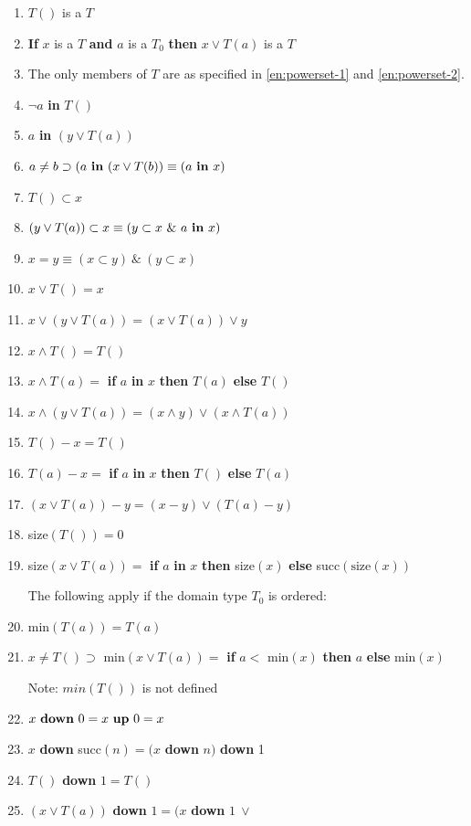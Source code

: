 \documentclass[twoside,11pt]{book}
\begin{document}
\begin{enumerate}[wide, nosep, label=(\arabic*)]
	\item \label{en:powerset-1}
	$T()$ is a $T$
	\item \label{en:powerset-2}
	\textbf{If} $x$ is a $T$ \textbf{and} $a$ is a $T_0$ \textbf{then} $x \vee T(a)$ is a $T$
	\item The only members of $T$ are as specified in \ref{en:powerset-1} and \ref{en:powerset-2}.
	\item $\neg a$ \textbf{in} $T()$
	\item $a$ \textbf{in} $(y \lor T(a))$
	\item $a \neq b \supset (a \text{ \textbf{in} } (x \lor T(b)) \equiv (a \text{ \textbf{in} } x)$
	\item $T() \subset x$
	\item $(y \lor T(a)) \subset x \equiv (y \subset x\ \&\ a \text{ \textbf{in} } x)$
	\item $x = y \equiv (x \subset y)\ \&\ (y \subset x)$
	\setcounter{enumi}{9}
	\item $x \lor T() = x$
	\item $x \lor (y \lor T(a)) = (x \lor T(a)) \lor y$
	\item $x \land T() = T()$
	\item $x \land T(a) =$ \textbf{if} $a$ \textbf{in} $x$ \textbf{then} $T(a)$ \textbf{else} $T()$
	\item $x \land (y \lor T(a)) = (x \land y) \lor (x \land T(a))$
	\item $T() - x = T()$
	\item $T(a) - x =$ \textbf{if} $a$ \textbf{in} $x$ \textbf{then} $T()$ \textbf{else} $T(a)$
	\item $(x \lor T(a)) - y = (x - y) \lor (T(a) - y)$
	\item size$(T()) = 0$
	\item size$(x \lor T(a)) =$ \textbf{if} $a$ \textbf{in} $x$ \textbf{then} size$(x)$ \textbf{else} succ$(\text{size}(x))$

	The following apply if the domain type $T_0$ is ordered:

	\item min$(T(a)) = T(a)$
	\item $x \neq T() \supset$ min$(x \lor T(a)) =$ \textbf{if} $a <$ min$(x)$ \textbf{then} $a$ \textbf{else} min$(x)$

	\noindent
	Note: $min(T())$ is not defined

	\item $x \text{ \textbf{down} } 0 = x \text{ \textbf{up} } 0 = x$
	\item $x$ \textbf{down} succ$(n) = (x$ \textbf{down} $n)$ \textbf{down} 1
	\item $T()$ \textbf{down} $1 = T()$
	\item $(x \lor T(a))$ \textbf{down} $1 = (x$ \textbf{down} $1\ \lor$
	

\end{enumerate}
\end{document}
